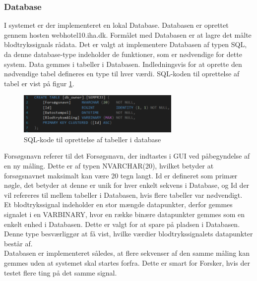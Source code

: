 \subsubsection{Database}
I systemet er der implementeret en lokal Database. Databasen er oprettet gennem hosten webhotel10.iha.dk. Formålet med Databasen er at lagre det målte blodtrykssignals rådata. Det er valgt at implementere Databasen af typen SQL, da denne database-type indeholder de funktioner, som er nødvendige for dette system. Data gemmes i tabeller i Databasen. Indledningsvis for at oprette den nødvendige tabel defineres en type til hver værdi. SQL-koden til oprettelse af tabel er vist på figur \ref{fig:SQL-kode}.
\begin{figure}[H]
	\centering
	\includegraphics[width=0.7\textwidth]{Figurer/SQLDatabase}
	\caption{SQL-kode til oprettelse af tabeller i database}
	\label{fig:SQL-kode}
\end{figure}
Forsøgsnavn referer til det Forsøgsnavn, der indtastes i GUI ved påbegyndelse af en ny måling. Dette er af typen NVARCHAR(20), hvilket betyder at forsøgsnavnet maksimalt kan være 20 tegn langt. Id er defineret som primær nøgle, det betyder at denne er unik for hver enkelt sekvens i Database, og Id der vil refereres til mellem tabeller i Databasen, hvis flere tabeller var nødvendigt. \\  
Et blodtrykssignal indeholder en stor mængde datapunkter, derfor gemmes signalet i en VARBINARY, hvor en række binære datapunkter gemmes som en enkelt enhed i Databasen. Dette er valgt for at spare på pladsen i Databasen. Denne type besværliggør at få vist, hvilke værdier blodtrykssignalets datapunkter består af. \\
Databasen er implementeret således, at flere sekvenser af den samme måling kan gemmes uden at systemet skal startes forfra. Dette er smart for Forsker, hvis der testet flere ting på det samme signal.  

